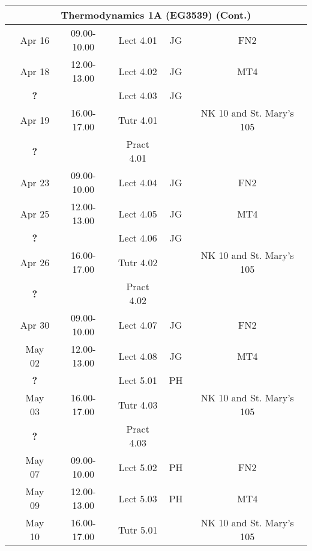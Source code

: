 \documentclass[11pt,oneside,a4paper]{article}
\begin{document}
\begin{center}
\begin{tabular}{||c||c|c|c|c|c||}
\hline\hline
\multicolumn{6}{||c||}{Thermodynamics 1A (EG3539) (Cont.)} \\
\hline\hline
\multirow{6}{*}{\color{red}{Week 41}} & Apr 16   & 09.00-10.00 & Lect  4.01  & JG  & FN2 \\
                                      & Apr 18   & 12.00-13.00 & Lect  4.02  & JG  & MT4 \\
                                      &  {\bf ?} &             & Lect  4.03  & JG  &     \\
                                      & Apr 19   & 16.00-17.00 & Tutr  4.01  &     & NK 10 and St. Mary's 105 \\
                                      &  {\bf ?} &             & Pract 4.01  &     &     \\
\hline
\multirow{6}{*}{\color{red}{Week 42}} & Apr 23   & 09.00-10.00 & Lect  4.04  & JG  & FN2 \\
                                      & Apr 25   & 12.00-13.00 & Lect  4.05  & JG  & MT4 \\
                                      &  {\bf ?} &             & Lect  4.06  & JG  &     \\
                                      & Apr 26   & 16.00-17.00 & Tutr  4.02  &     & NK 10 and St. Mary's 105 \\
                                      &  {\bf ?} &             & Pract 4.02  &     &     \\
\hline
\multirow{6}{*}{\color{red}{Week 43}} & Apr 30   & 09.00-10.00 & Lect  4.07  & JG  & FN2 \\
                                      & May 02   & 12.00-13.00 & Lect  4.08  & JG  & MT4 \\
                                      &  {\bf ?} &             & Lect  5.01  & PH  &     \\
                                      & May 03   & 16.00-17.00 & Tutr  4.03  &     & NK 10 and St. Mary's 105 \\
                                      &  {\bf ?} &             & Pract 4.03  &     &     \\
\hline
\multirow{6}{*}{\color{red}{Week 44}} & May 07   & 09.00-10.00 & Lect  5.02  & PH  & FN2 \\
                                      & May 09   & 12.00-13.00 & Lect  5.03  & PH  & MT4 \\
                                      & May 10   & 16.00-17.00 & Tutr  5.01  &     & NK 10 and St. Mary's 105 \\

\end{tabular}
\end{center}
\end{document}
